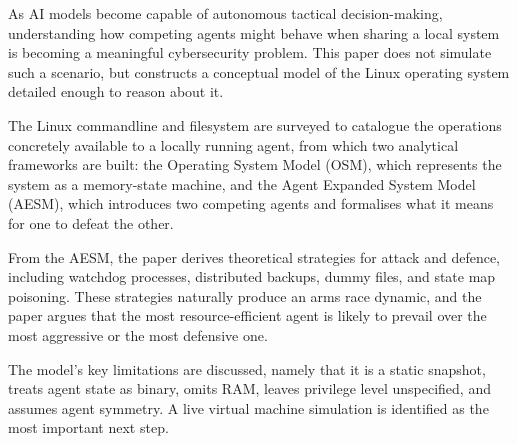 As AI models become capable of autonomous tactical decision-making, understanding how competing agents might behave when sharing a local system is becoming a meaningful cybersecurity problem. This paper does not simulate such a scenario, but constructs a conceptual model of the Linux operating system detailed enough to reason about it.

The Linux commandline and filesystem are surveyed to catalogue the operations concretely available to a locally running agent, from which two analytical frameworks are built: the Operating System Model (OSM), which represents the system as a memory-state machine, and the Agent Expanded System Model (AESM), which introduces two competing agents and formalises what it means for one to defeat the other.

From the AESM, the paper derives theoretical strategies for attack and defence, including watchdog processes, distributed backups, dummy files, and state map poisoning. These strategies naturally produce an arms race dynamic, and the paper argues that the most resource-efficient agent is likely to prevail over the most aggressive or the most defensive one.

The model's key limitations are discussed, namely that it is a static snapshot, treats agent state as binary, omits RAM, leaves privilege level unspecified, and assumes agent symmetry. A live virtual machine simulation is identified as the most important next step.